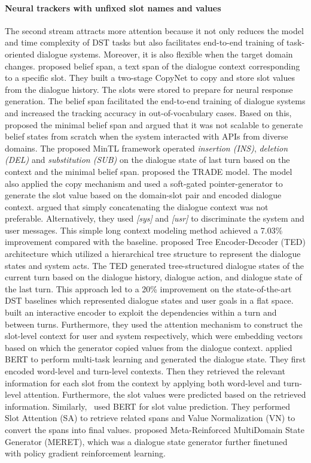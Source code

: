 \paragraph*{Neural trackers with unfixed slot names and values} The second stream attracts more attention because it not only reduces the model and time complexity of DST tasks but also facilitates end-to-end training of task-oriented dialogue systems. Moreover, it is also flexible when the target domain changes.  proposed belief span, a text span of the dialogue context corresponding to a specific slot. They built a two-stage CopyNet to copy and store slot values from the dialogue history. The slots were stored to prepare for neural response generation. The belief span facilitated the end-to-end training of dialogue systems and increased the tracking accuracy in out-of-vocabulary cases. Based on this,~ proposed the minimal belief span and argued that it was not scalable to generate belief states from scratch when the system interacted with APIs from diverse domains. The proposed MinTL framework operated \textit{insertion (INS)}, \textit{deletion (DEL)} and \textit{substitution (SUB)} on the dialogue state of last turn based on the context and the minimal belief span.  proposed the TRADE model. The model also applied the copy mechanism and used a soft-gated pointer-generator to generate the slot value based on the domain-slot pair and encoded dialogue context.  argued that simply concatenating the dialogue context was not preferable. Alternatively, they used \textit{[sys]} and \textit{[usr]} to discriminate the system and user messages. This simple long context modeling method achieved a 7.03\% improvement compared with the baseline.  proposed Tree Encoder-Decoder (TED) architecture which utilized a hierarchical tree structure to represent the dialogue states and system acts. The TED generated tree-structured dialogue states of the current turn based on the dialogue history, dialogue action, and dialogue state of the last turn. This approach led to a 20\% improvement on the state-of-the-art DST baselines which represented dialogue states and user goals in a flat space.  built an interactive encoder to exploit the dependencies within a turn and between turns. Furthermore, they used the attention mechanism to construct the slot-level context for user and system respectively, which were embedding vectors based on which the generator copied values from the dialogue context.  applied BERT to perform multi-task learning and generated the dialogue state. They first encoded word-level and turn-level contexts. Then they retrieved the relevant information for each slot from the context by applying both word-level and turn-level attention. Furthermore, the slot values were predicted based on the retrieved information. Similarly,~ used BERT for slot value prediction. They performed Slot Attention (SA) to retrieve related spans and Value Normalization (VN) to convert the spans into final values.  proposed Meta-Reinforced MultiDomain State Generator (MERET), which was a dialogue state generator further finetuned with policy gradient reinforcement learning.


